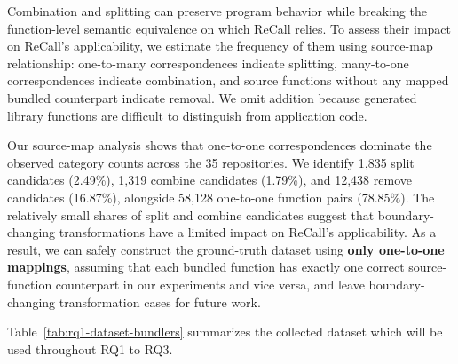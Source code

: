 Combination and splitting can preserve program behavior while breaking the function-level semantic equivalence on which ReCall relies. To assess their impact on ReCall’s applicability, we estimate the frequency of them using source-map relationship: one-to-many correspondences indicate splitting, many-to-one correspondences indicate combination, and source functions without any mapped bundled counterpart indicate removal. We omit addition because generated library functions are difficult to distinguish from application code.

Our source-map analysis shows that one-to-one correspondences dominate the observed category counts across the 35 repositories. We identify 1,835 split candidates (2.49\%), 1,319 combine candidates (1.79\%), and 12,438 remove candidates (16.87\%), alongside 58,128 one-to-one function pairs (78.85\%). The relatively small shares of split and combine candidates suggest that boundary-changing transformations have a limited impact on ReCall’s applicability. As a result, we can safely construct the ground-truth dataset using \textbf{only one-to-one mappings}, assuming that each bundled function has exactly one correct source-function counterpart in our experiments and vice versa, and leave boundary-changing transformation cases for future work.

Table~\ref{tab:rq1-dataset-bundlers} summarizes the collected dataset which will be used throughout RQ1 to RQ3.

